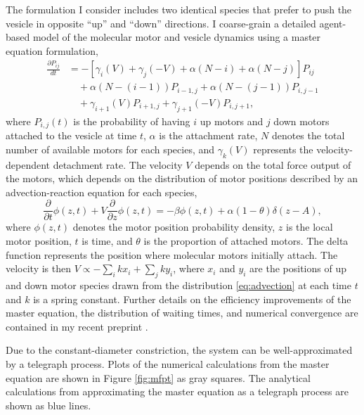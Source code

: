 \documentclass[a4paper,11pt]{article}
\newcommand{\pa}{\partial}
\begin{document}
	The formulation I consider includes two identical species that prefer to push the vesicle in opposite ``up'' and ``down'' directions. I coarse-grain a detailed agent-based model of the molecular motor and vesicle dynamics using a master equation formulation,
	\begin{equation*}
		\begin{split}
			\frac{\pa P_{ij}}{dt} &= -\left[\gamma_i(V) + \gamma_j(-V) + \alpha (N - i) + \alpha( N - j)\right]P_{ij}\\
			&\quad + \alpha(N - (i-1)) P_{i-1,j} + \alpha (N - (j-1)) P_{i,j-1}\\
			&\quad + \gamma_{i+1}(V)P_{i+1,j} + \gamma_{j+1}(-V)P_{i,j+1},
		\end{split}
	\end{equation*}
	where $P_{i,j}(t)$ is the probability of having $i$ up motors and $j$ down motors attached to the vesicle at time $t$, $\alpha$ is the attachment rate, $N$ denotes the total number of available motors for each species, and $\gamma_k(V)$ represents the velocity-dependent detachment rate. The velocity $V$ depends on the total force output of the motors, which depends on the distribution of motor positions described by an advection-reaction equation for each species,
	\begin{equation}\label{eq:advection}
		\frac{\pa}{\pa t}\phi\left(z,t\right) + V\frac{\pa}{\pa z}\phi\left(z,t\right) = -\beta \phi(z,t) + \alpha(1-\theta)\delta(z-A),
	\end{equation}
	where $\phi(z,t)$ denotes the motor position probability density, $z$ is the local motor position, $t$ is time, and $\theta$ is the proportion of attached motors. The delta function represents the position where molecular motors initially attach. The velocity is then $V \propto -\sum_i k x_i  + \sum_j k y_i$, where $x_i$ and $y_i$ are the positions of up and down motor species drawn from the distribution \eqref{eq:advection} at each time $t$ and $k$ is a spring constant. Further details on the efficiency improvements of the master equation, the distribution of waiting times, and numerical convergence are contained in my recent preprint \cite{park2021coarse}.
	
	Due to the constant-diameter constriction, the system can be well-approximated by a telegraph process. Plots of the numerical calculations from the master equation are shown in Figure \ref{fig:mfpt} as gray squares. The analytical calculations from approximating the master equation as a telegraph process are shown as blue lines.
	
\end{document}
